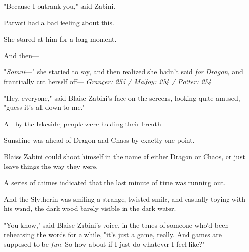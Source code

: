 "Because I outrank you," said Zabini.

Parvati had a bad feeling about this.

She stared at him for a long moment.

And then---

"\emph{Somni}\mbox{---}" she started to say, and then realized she hadn't said \emph{for
Dragon,} and frantically cut herself off---
\sbreak
\emph{Granger: 255 / Malfoy: 254 / Potter: 254}

"Hey, everyone," said Blaise Zabini's face on the screens, looking quite
amused, "guess it's all down to me."

All by the lakeside, people were holding their breath.

Sunshine was ahead of Dragon and Chaos by exactly one point.

Blaise Zabini could shoot himself in the name of either Dragon or Chaos, or
just leave things the way they were.

A series of chimes indicated that the last minute of time was running out.

And the Slytherin was smiling a strange, twisted smile, and casually toying
with his wand, the dark wood barely visible in the dark water.

"You know," said Blaise Zabini's voice, in the tones of someone who'd been
rehearsing the words for a while, "it's just a game, really. And games are
supposed to be \emph{fun.} So how about if I just do whatever I feel like?"

